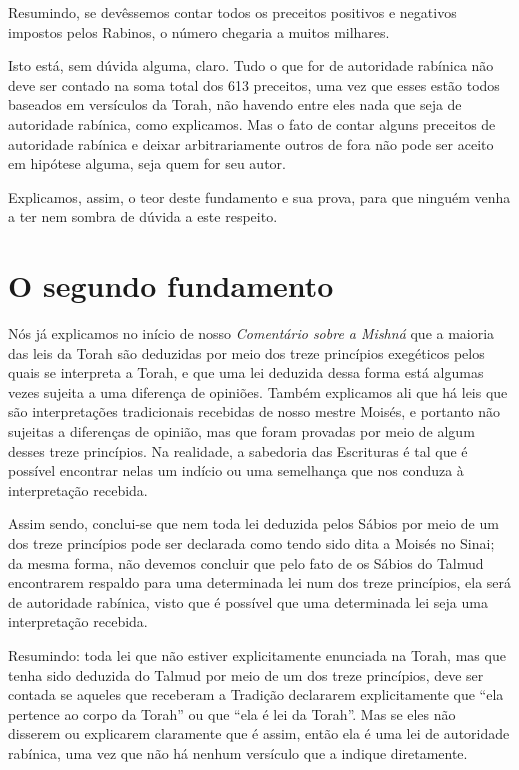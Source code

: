 Resumindo, se devêssemos contar todos os preceitos positivos e
ne­gativos impostos pelos Rabinos, o número chegaria a muitos milhares.

Isto está, sem dúvida alguma, claro. Tudo o que for de autoridade
rabínica não deve ser contado na soma total dos 613 preceitos, uma vez
que esses estão todos baseados em versículos da Torah, não havendo entre
eles na­da que seja de autoridade rabínica, como explicamos. Mas o fato
de contar al­guns preceitos de autoridade rabínica e deixar
arbitrariamente outros de fora não pode ser aceito em hipótese alguma,
seja quem for seu autor.

Explicamos, assim, o teor deste fundamento e sua prova, para que ninguém
venha a ter nem sombra de dúvida a este respeito.

\chapter*{O segundo fundamento
}

Nós já explicamos no início de nosso \emph{Comentário sobre a Mishná}
que a maioria das leis da Torah são deduzidas por meio dos treze
princípios exegéticos pelos quais se interpreta a Torah, e que uma lei
deduzida dessa for­ma está algumas vezes sujeita a uma diferença de
opiniões. Também explica­mos ali que há leis que são interpretações
tradicionais recebidas de nosso mes­tre Moisés, e portanto não sujeitas
a diferenças de opinião, mas que foram pro­vadas por meio de algum
desses treze princípios. Na realidade, a sabedoria das Escrituras é tal
que é possível encontrar nelas um indício ou uma semelhança que nos
conduza à interpretação recebida.

Assim sendo, conclui-se que nem toda lei deduzida pelos Sábios por meio
de um dos treze princípios pode ser declarada como tendo sido dita a
Moisés no Sinai; da mesma forma, não devemos concluir que pelo fato de
os Sábios do Talmud encontrarem respaldo para uma determinada lei num
dos treze princípios, ela será de autoridade rabínica, visto que é
possível que uma
determinada lei seja uma interpretação recebida.

Resumindo: toda lei que não estiver explicitamente enunciada na To­rah,
mas que tenha sido deduzida do Talmud por meio de um dos treze
princí­pios, deve ser contada se aqueles que receberam a Tradição
declararem expli­citamente que ``ela pertence ao corpo da Torah'' ou que
``ela é lei da Torah''. Mas se eles não disserem ou explicarem claramente
que é assim, então ela é uma lei de autoridade rabínica, uma vez que não
há nenhum versículo que a indique diretamente.

